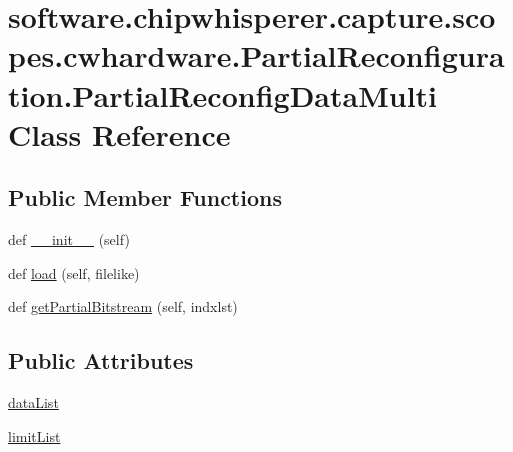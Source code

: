 \hypertarget{classsoftware_1_1chipwhisperer_1_1capture_1_1scopes_1_1cwhardware_1_1PartialReconfiguration_1_1PartialReconfigDataMulti}{}\section{software.\+chipwhisperer.\+capture.\+scopes.\+cwhardware.\+Partial\+Reconfiguration.\+Partial\+Reconfig\+Data\+Multi Class Reference}
\label{classsoftware_1_1chipwhisperer_1_1capture_1_1scopes_1_1cwhardware_1_1PartialReconfiguration_1_1PartialReconfigDataMulti}
\subsection*{Public Member Functions}
\begin{DoxyCompactItemize}
\item 
def \hyperlink{classsoftware_1_1chipwhisperer_1_1capture_1_1scopes_1_1cwhardware_1_1PartialReconfiguration_1_1PartialReconfigDataMulti_ae624f389651552e2f701752ffbad0f25}{\+\_\+\+\_\+init\+\_\+\+\_\+} (self)
\item 
def \hyperlink{classsoftware_1_1chipwhisperer_1_1capture_1_1scopes_1_1cwhardware_1_1PartialReconfiguration_1_1PartialReconfigDataMulti_a7462ebeb4a7c2536a5ed574030c80907}{load} (self, filelike)
\item 
def \hyperlink{classsoftware_1_1chipwhisperer_1_1capture_1_1scopes_1_1cwhardware_1_1PartialReconfiguration_1_1PartialReconfigDataMulti_aff4c08fc88b87b47cea93c9bb37c49f2}{get\+Partial\+Bitstream} (self, indxlst)
\end{DoxyCompactItemize}
\subsection*{Public Attributes}
\begin{DoxyCompactItemize}
\item 
\hyperlink{classsoftware_1_1chipwhisperer_1_1capture_1_1scopes_1_1cwhardware_1_1PartialReconfiguration_1_1PartialReconfigDataMulti_a2ecab9652c5d5c70416f6da56bdf7c76}{data\+List}
\item 
\hyperlink{classsoftware_1_1chipwhisperer_1_1capture_1_1scopes_1_1cwhardware_1_1PartialReconfiguration_1_1PartialReconfigDataMulti_a37f9fa12008e1e061d085f1548599cdc}{limit\+List}
\end{DoxyCompactItemize}


